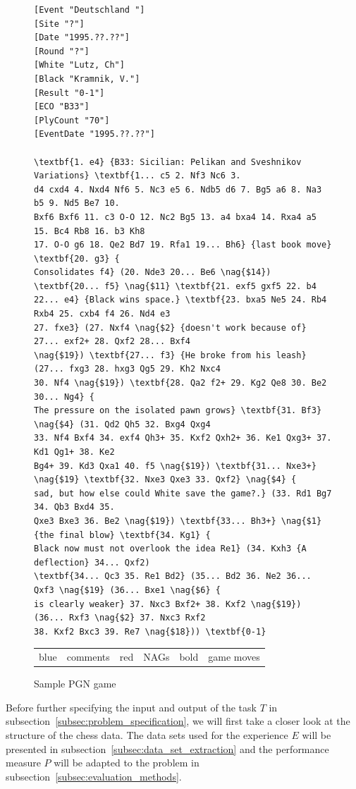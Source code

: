 \documentclass[article,type=msc,colorback,accentcolor=tud7b]{tudthesis}
\begin{document}
	\begin{figure}[H]
	  \centering
	  \begin{lstlisting}	  
[Event "Deutschland "]
[Site "?"]
[Date "1995.??.??"]
[Round "?"]
[White "Lutz, Ch"]
[Black "Kramnik, V."]
[Result "0-1"]
[ECO "B33"]
[PlyCount "70"]
[EventDate "1995.??.??"]

\textbf{1. e4} {B33: Sicilian: Pelikan and Sveshnikov Variations} \textbf{1... c5 2. Nf3 Nc6 3.
d4 cxd4 4. Nxd4 Nf6 5. Nc3 e5 6. Ndb5 d6 7. Bg5 a6 8. Na3 b5 9. Nd5 Be7 10.
Bxf6 Bxf6 11. c3 O-O 12. Nc2 Bg5 13. a4 bxa4 14. Rxa4 a5 15. Bc4 Rb8 16. b3 Kh8
17. O-O g6 18. Qe2 Bd7 19. Rfa1 19... Bh6} {last book move} \textbf{20. g3} {
Consolidates f4} (20. Nde3 20... Be6 \nag{$14}) \textbf{20... f5} \nag{$11} \textbf{21. exf5 gxf5 22. b4
22... e4} {Black wins space.} \textbf{23. bxa5 Ne5 24. Rb4 Rxb4 25. cxb4 f4 26. Nd4 e3
27. fxe3} (27. Nxf4 \nag{$2} {doesn't work because of} 27... exf2+ 28. Qxf2 28... Bxf4
\nag{$19}) \textbf{27... f3} {He broke from his leash} (27... fxg3 28. hxg3 Qg5 29. Kh2 Nxc4
30. Nf4 \nag{$19}) \textbf{28. Qa2 f2+ 29. Kg2 Qe8 30. Be2 30... Ng4} {
The pressure on the isolated pawn grows} \textbf{31. Bf3} \nag{$4} (31. Qd2 Qh5 32. Bxg4 Qxg4
33. Nf4 Bxf4 34. exf4 Qh3+ 35. Kxf2 Qxh2+ 36. Ke1 Qxg3+ 37. Kd1 Qg1+ 38. Ke2
Bg4+ 39. Kd3 Qxa1 40. f5 \nag{$19}) \textbf{31... Nxe3+} \nag{$19} \textbf{32. Nxe3 Qxe3 33. Qxf2} \nag{$4} {
sad, but how else could White save the game?.} (33. Rd1 Bg7 34. Qb3 Bxd4 35.
Qxe3 Bxe3 36. Be2 \nag{$19}) \textbf{33... Bh3+} \nag{$1} {the final blow} \textbf{34. Kg1} {
Black now must not overlook the idea Re1} (34. Kxh3 {A deflection} 34... Qxf2)
\textbf{34... Qc3 35. Re1 Bd2} (35... Bd2 36. Ne2 36... Qxf3 \nag{$19} (36... Bxe1 \nag{$6} {
is clearly weaker} 37. Nxc3 Bxf2+ 38. Kxf2 \nag{$19}) (36... Rxf3 \nag{$2} 37. Nxc3 Rxf2
38. Kxf2 Bxc3 39. Re7 \nag{$18})) \textbf{0-1}
	  \end{lstlisting}	  

      \caption{Sample PGN game}
      \begin{tabular}{r@{: }l r@{: }l r@{: }l}
        blue & comments & red & NAGs & bold & game moves
      \end{tabular}
      \label{fig:sample_pgn_game}
	\end{figure}
	
    Before further specifying the input and output of the task $T$ in subsection~\ref{subsec:problem_specification}, we will first take a closer look at the structure of the chess data. The data sets used for the experience $E$ will be presented in subsection~\ref{subsec:data_set_extraction} and the performance measure $P$ will be adapted to the problem in subsection~\ref{subsec:evaluation_methods}.
    
\end{document}
